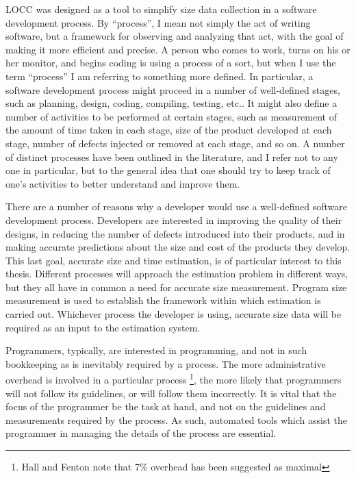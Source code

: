 LOCC was designed as a tool to simplify size data collection 
in a software development process.  By ``process'', I mean not simply
the act of writing software, but a framework for observing and
analyzing that act, with the goal of making it more efficient and
precise.  A person who comes to work, turns on his or her monitor, and 
begins coding is using a process of a sort, but when I use the term
``process'' I am referring to something more defined.  In particular, a 
software development process might proceed in a number of well-defined 
stages, such as planning, design, coding, compiling, testing, etc..
It might also define a number of activities to be performed at certain 
stages, such as measurement of the amount of time taken in each stage, 
size of the product developed at each stage, number of defects injected 
or removed at each stage, and so on.  A number of distinct processes
have been outlined in the literature\cite{Boehm,Humphrey}, and I
refer not to any one in particular, but to the general idea that one
should try to keep track of one's activities to better understand and
improve them.

There are a number of reasons why a developer would use a well-defined
software development process.  Developers are interested in improving the
quality of their designs, in reducing the number of defects introduced into 
their products, and in making accurate predictions about the size and cost
of the products they develop.  This last goal, accurate size and time
estimation, is of particular interest to this thesis.  Different processes
will approach the estimation problem in different ways, but they all have
in common a need for accurate size measurement.  Program size measurement
is used to establish the framework within which estimation is carried out.
Whichever process the developer is using, accurate size data will be
required as an input to the estimation system.

Programmers, typically, are interested in programming, and not
in such bookkeeping as is inevitably required by a process.
The more administrative overhead is involved in a particular process
\footnote{Hall and Fenton\cite{Hall97} note that 7\% overhead has been
  suggested as  maximal}, 
the more likely that programmers will not follow its guidelines, or
will follow them incorrectly\cite{Disney}.  It is vital that the focus of
the programmer be the task at hand, and not on the guidelines and
measurements required by the process.  As such, automated tools which
assist the programmer in managing the details of the process are
essential\cite{Grady,Humphrey}.

